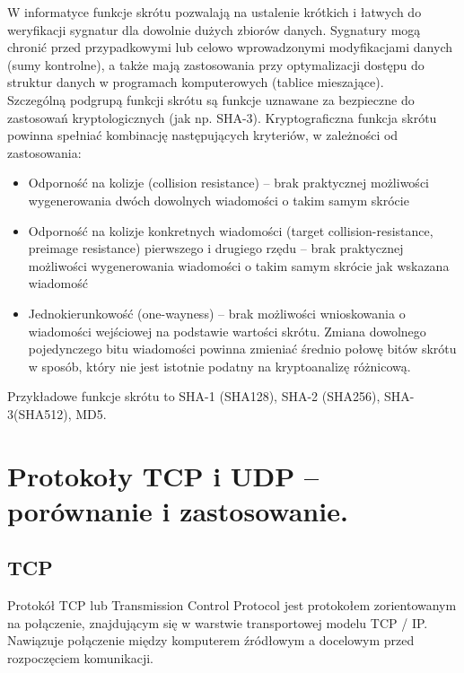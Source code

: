 \documentclass[a4paper,12pt,oneside]{book}
\begin{document}
			W informatyce funkcje skrótu pozwalają na ustalenie krótkich i łatwych do weryfikacji sygnatur dla dowolnie dużych zbiorów danych. Sygnatury mogą chronić przed przypadkowymi lub celowo wprowadzonymi modyfikacjami danych (sumy kontrolne), a także mają zastosowania przy optymalizacji dostępu do struktur danych w programach komputerowych (tablice mieszające).\\
			
			Szczególną podgrupą funkcji skrótu są funkcje uznawane za bezpieczne do zastosowań kryptologicznych (jak np. SHA-3). Kryptograficzna funkcja skrótu powinna spełniać kombinację następujących kryteriów, w zależności od zastosowania:\\
			\begin{itemize}
				\item Odporność na kolizje (collision resistance) – brak praktycznej możliwości wygenerowania dwóch dowolnych wiadomości o takim samym skrócie
				\item Odporność na kolizje konkretnych wiadomości (target collision-resistance, preimage resistance) pierwszego i drugiego rzędu – brak praktycznej możliwości wygenerowania wiadomości o takim samym skrócie jak wskazana wiadomość
				\item Jednokierunkowość (one-wayness) – brak możliwości wnioskowania o wiadomości wejściowej na podstawie wartości skrótu. Zmiana dowolnego pojedynczego bitu wiadomości powinna zmieniać średnio połowę bitów skrótu w sposób, który nie jest istotnie podatny na kryptoanalizę różnicową.
			\end{itemize}
			
			Przykładowe funkcje skrótu to SHA-1 (SHA128), SHA-2 (SHA256), SHA-3(SHA512), MD5.
		
		\setcounter{section}{8}
		\section{Protokoły TCP i UDP – porównanie i zastosowanie.}
		\subsection*{TCP}
		
		Protokół TCP lub Transmission Control Protocol jest protokołem zorientowanym na połączenie, znajdującym się w warstwie transportowej modelu TCP / IP. Nawiązuje połączenie między komputerem źródłowym a docelowym przed rozpoczęciem komunikacji.
		
\end{document}
